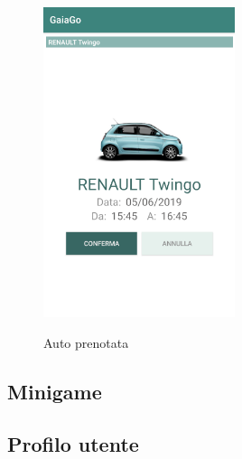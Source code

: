 \begin{itemize}
\begin{figure}[H]
		\includegraphics[width=0.5\textwidth]{res/images/conferma_prenotazione.png}\\
		\caption{Auto prenotata}
		\label{prenotata}
	\end{figure}
\end{itemize}

\subsection{Minigame}


\subsection{Profilo utente}

